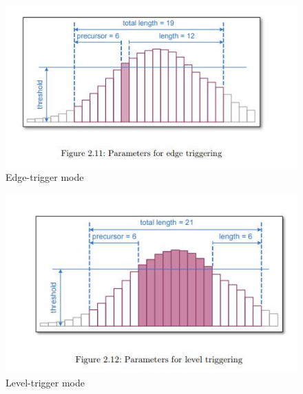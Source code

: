 \begin{figure}[t!p]
\centering
\includegraphics[width=1\textwidth]{figures/chapter_background/ADC_edge.jpg}
\caption{Edge-trigger mode}
\label{fig:ADC_edge}
\end{figure}
 
\begin{figure}[t!p] 
\centering
\includegraphics[width=1\textwidth]{figures/chapter_background/ADC_level.jpg}
\caption{Level-trigger mode}
\label{fig:ADC_level}
\end{figure}
 